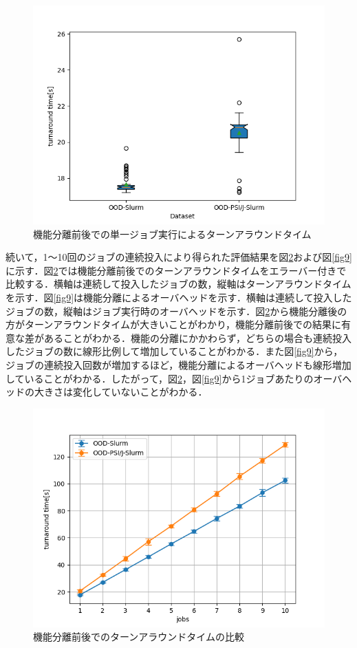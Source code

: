 \begin{figure}[tb]
    \centering
    \includegraphics[width=120mm]{./fig/boxplot.png}
    \caption{機能分離前後での単一ジョブ実行によるターンアラウンドタイム}
    \label{boxplot}
\end{figure}

続いて，1～10回のジョブの連続投入により得られた評価結果を図\ref{fig8}および図\ref{fig9}に示す．図\ref{fig8}では機能分離前後でのターンアラウンドタイムをエラーバー付きで比較する．横軸は連続して投入したジョブの数，縦軸はターンアラウンドタイムを示す．図\ref{fig9}は機能分離によるオーバヘッドを示す．横軸は連続して投入したジョブの数，縦軸はジョブ実行時のオーバヘッドを示す．図\ref{fig8}から機能分離後の方がターンアラウンドタイムが大きいことがわかり，機能分離前後での結果に有意な差があることがわかる．機能の分離にかかわらず，どちらの場合も連続投入したジョブの数に線形比例して増加していることがわかる．また図\ref{fig9}から，ジョブの連続投入回数が増加するほど，機能分離によるオーバヘッドも線形増加していることがわかる．したがって，図\ref{fig8}，図\ref{fig9}から1ジョブあたりのオーバヘッドの大きさは変化していないことがわかる．\par

\begin{figure}[tb]
    \centering
    \includegraphics[width=120mm]{./fig/1-10jobs.png}
    \caption{機能分離前後でのターンアラウンドタイムの比較}
    \label{fig8}
\end{figure}
  
